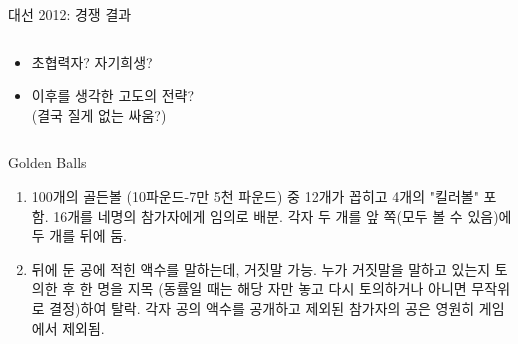 \documentclass[final]{beamer}
\newcounter{saveenumi}
\newcommand{\seti}{\setcounter{saveenumi}{\value{enumi}}}
\begin{document}
\begin{frame}[t]{대선 2012: 경쟁 결과}
	\begin{columns}[c] %
		\begin{column}[T]{5cm} %
		\begin{itemize}
			\item 초협력자? 자기희생?
			\item 이후를 생각한 고도의 전략? \\ (결국 질게 없는 싸움?)
		\end{itemize}
		\end{column}
		\begin{column}[T]{5cm} %
		\end{column}
	\end{columns}
\end{frame}

\begin{frame}[t]{Golden Balls}
	\begin{enumerate}
		\item 100개의 골든볼 (10파운드-7만 5천 파운드) 중 12개가 꼽히고 4개의 "킬러볼" 포함. 16개를 네명의 참가자에게 임의로 배분. 각자 두 개를 앞 쪽(모두 볼 수 있음)에 두 개를 뒤에 둠. 
		\item 뒤에 둔 공에 적힌 액수를 말하는데, 거짓말 가능. 누가 거짓말을 말하고 있는지 토의한 후 한 명을 지목 (동률일 때는 해당 자만 놓고 다시 토의하거나 아니면 무작위로 결정)하여 탈락. 각자 공의 액수를 공개하고 제외된 참가자의 공은 영원히 게임에서 제외됨. 
		\seti
	\end{enumerate}
\end{frame}
\end{document}
